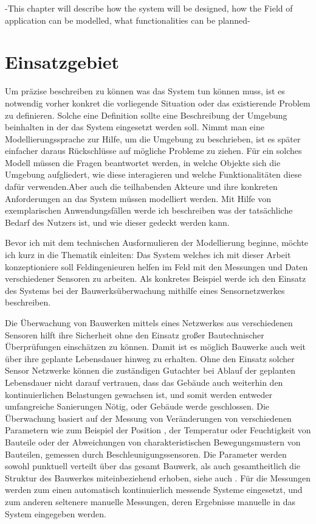 -This chapter will describe how the system will be designed, how the Field of application can be modelled, what functionalities can be planned-

\section{Einsatzgebiet}
Um präzise beschreiben zu können was das System tun können muss, ist es notwendig vorher konkret die vorliegende Situation oder das existierende Problem zu definieren. Solche eine Definition sollte eine Beschreibung der Umgebung beinhalten in der das System eingesetzt werden soll. Nimmt man eine Modellierungssprache zur Hilfe, um die Umgebung zu beschrieben, ist es später einfacher daraus Rückschlüsse auf mögliche Probleme zu ziehen. Für ein solches Modell müssen die Fragen beantwortet werden, in welche Objekte sich die Umgebung aufgliedert, wie diese interagieren und welche Funktionalitäten diese dafür verwenden.Aber auch die teilhabenden Akteure und ihre konkreten Anforderungen an das System müssen modelliert werden. Mit Hilfe von exemplarischen Anwendungsfällen werde ich beschreiben was der tatsächliche Bedarf des Nutzers ist, und wie dieser gedeckt werden kann.

Bevor ich mit dem technischen Ausformulieren der Modellierung beginne, möchte ich kurz in die Thematik einleiten: Das System welches ich mit dieser Arbeit konzeptioniere soll Feldingenieuren helfen im Feld mit den Messungen und Daten verschiedener Sensoren zu arbeiten. Als konkretes Beispiel werde ich den Einsatz des Systems bei der Bauwerksüberwachung mithilfe eines Sensornetzwerkes beschreiben.

Die Überwachung von Bauwerken mittels eines Netzwerkes aus verschiedenen Sensoren hilft ihre Sicherheit ohne den Einsatz großer Bautechnischer Überprüfungen einschätzen zu können. Damit ist es möglich Bauwerke auch weit über ihre geplante Lebensdauer hinweg zu erhalten. Ohne den Einsatz solcher Sensor Netzwerke können die zuständigen Gutachter bei Ablauf der geplanten Lebensdauer nicht darauf vertrauen, dass das Gebäude auch weiterhin den kontinuierlichen Belastungen gewachsen ist, und somit werden entweder umfangreiche Sanierungen Nötig, oder Gebäude werde geschlossen. Die Überwachung basiert auf der Messung von Veränderungen von verschiedenen Parametern wie zum Beispiel der Position , der Temperatur oder Feuchtigkeit von Bauteile oder der Abweichungen von charakteristischen Bewegungsmustern von Bauteilen, gemessen durch Beschleunigungssensoren. Die Parameter werden sowohl punktuell  verteilt über das gesamt Bauwerk, als auch gesamtheitlich die Struktur des Bauwerkes miteinbeziehend erhoben, siehe auch \citep{worden_overview_2004} \citep{farrar_introduction_2007} \citep{boller_structural_2004}. Für die Messungen werden zum einen automatisch kontinuierlich messende Systeme eingesetzt, und zum anderen seltenere manuelle Messungen, deren Ergebnisse manuelle in das System eingegeben werden. 

